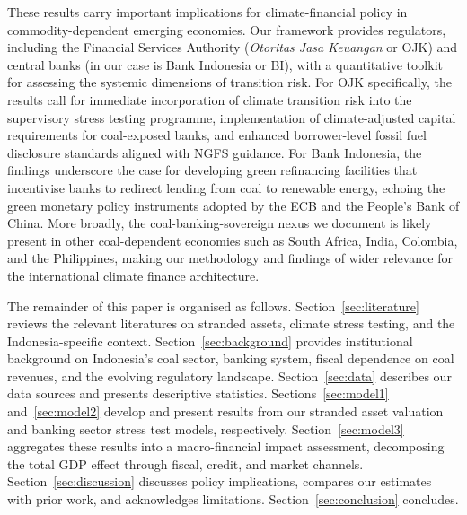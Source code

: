 These results carry important implications for climate-financial policy in commodity-dependent emerging economies. Our framework provides regulators, including the Financial Services Authority (\textit{Otoritas Jasa Keuangan} or OJK) and central banks (in our case is Bank Indonesia or BI), with a quantitative toolkit for assessing the systemic dimensions of transition risk. For OJK specifically, the results call for immediate incorporation of climate transition risk into the supervisory stress testing programme, implementation of climate-adjusted capital requirements for coal-exposed banks, and enhanced borrower-level fossil fuel disclosure standards aligned with NGFS guidance. For Bank Indonesia, the findings underscore the case for developing green refinancing facilities that incentivise banks to redirect lending from coal to renewable energy, echoing the green monetary policy instruments adopted by the ECB and the People's Bank of China. More broadly, the coal-banking-sovereign nexus we document is likely present in other coal-dependent economies such as South Africa, India, Colombia, and the Philippines, making our methodology and findings of wider relevance for the international climate finance architecture.

The remainder of this paper is organised as follows. Section~\ref{sec:literature} reviews the relevant literatures on stranded assets, climate stress testing, and the Indonesia-specific context. Section~\ref{sec:background} provides institutional background on Indonesia's coal sector, banking system, fiscal dependence on coal revenues, and the evolving regulatory landscape. Section~\ref{sec:data} describes our data sources and presents descriptive statistics. Sections~\ref{sec:model1} and~\ref{sec:model2} develop and present results from our stranded asset valuation and banking sector stress test models, respectively. Section~\ref{sec:model3} aggregates these results into a macro-financial impact assessment, decomposing the total GDP effect through fiscal, credit, and market channels. Section~\ref{sec:discussion} discusses policy implications, compares our estimates with prior work, and acknowledges limitations. Section~\ref{sec:conclusion} concludes.
